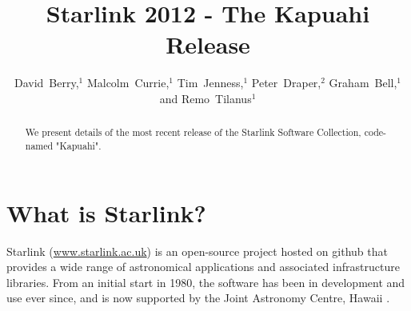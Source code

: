 
\resetcounters




\title{Starlink 2012 - The Kapuahi Release}

\author{David~Berry,$^1$ Malcolm~Currie,$^1$ Tim~Jenness,$^1$ Peter~Draper,$^2$ Graham~Bell,$^1$ and Remo~Tilanus$^1$
}


\begin{abstract}
We present details of the most recent release of the Starlink Software
Collection, code-named "Kapuahi".
\end{abstract}

\section{What is Starlink?}

Starlink (\url{www.starlink.ac.uk}) is an open-source project hosted on
github that provides a wide range of astronomical applications and
associated infrastructure libraries. From an initial start in 1980, the
software has been in development and use ever since, and is
now supported by the Joint Astronomy Centre, Hawaii
\citep{SSC_2009}.

